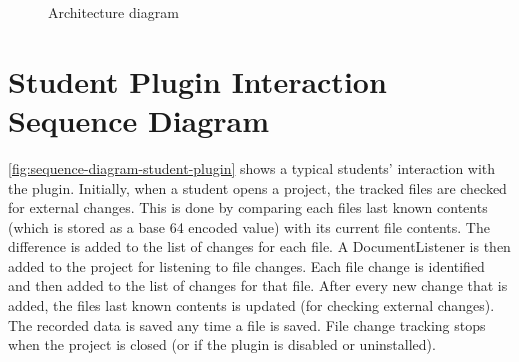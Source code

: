 \begin{figure}[H]
  \centering
  \caption[Final design architecture diagram]{Architecture diagram}
  \label{fig:architecture-diagram}
\end{figure}

\vspace*{\fill}

\newpage

\section{Student Plugin Interaction Sequence Diagram}
\autoref{fig:sequence-diagram-student-plugin} shows a typical students' interaction with the plugin. Initially, when a student opens a project, the tracked files are checked for external changes. This is done by comparing each files last known contents (which is stored as a base 64 encoded value) with its current file contents. The difference is added to the list of changes for each file. A DocumentListener is then added to the project for listening to file changes. Each file change is identified and then added to the list of changes for that file. After every new change that is added, the files last known contents is updated (for checking external changes). The recorded data is saved any time a file is saved. File change tracking stops when the project is closed (or if the plugin is disabled or uninstalled).

\vspace*{\fill}

